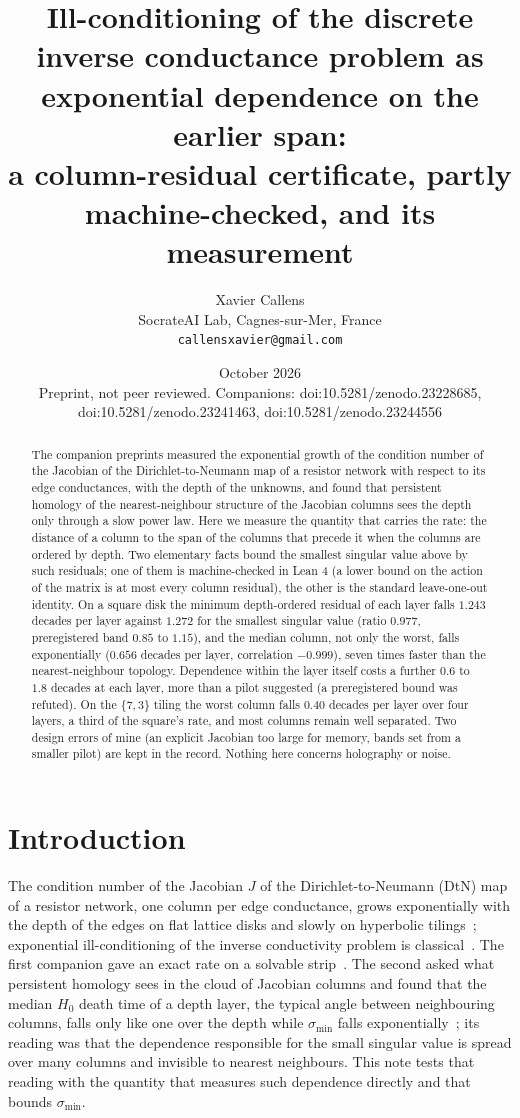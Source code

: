\documentclass[11pt,a4paper]{article}
\title{Ill-conditioning of the discrete inverse conductance problem as exponential dependence on the earlier span:\\ a column-residual certificate, partly machine-checked, and its measurement}
\author{Xavier Callens\\[2pt]
\small SocrateAI Lab, Cagnes-sur-Mer, France\\
\small \texttt{callensxavier@gmail.com}}
\date{October 2026 \\ \small Preprint, not peer reviewed. Companions: doi:10.5281/zenodo.23228685, doi:10.5281/zenodo.23241463, doi:10.5281/zenodo.23244556}
\begin{document}
\maketitle

\begin{abstract}
The companion preprints measured the exponential growth of the condition number of the Jacobian of the Dirichlet-to-Neumann map of a resistor network with respect to its edge conductances, with the depth of the unknowns, and found
that persistent homology of the nearest-neighbour structure of the Jacobian columns sees the depth only through a slow power law. Here we measure the quantity that carries the rate: the distance of a column to the span of the columns that precede it when
the columns are ordered by depth. Two elementary facts bound the smallest singular value above by such residuals; one of them is machine-checked in Lean 4 (a lower bound on the action of the matrix is at most every column residual), the other is the standard leave-one-out identity.
On a square disk the minimum depth-ordered residual of each layer falls $1.243$ decades per layer against $1.272$ for the smallest singular value (ratio $0.977$, preregistered band $0.85$ to $1.15$), and the median column, not only the worst, falls exponentially ($0.656$ decades per layer, correlation $-0.999$),
seven times faster than the nearest-neighbour topology. Dependence within the layer itself costs a further $0.6$ to $1.8$ decades at each layer, more than a pilot suggested (a preregistered bound was refuted). On the $\{7,3\}$ tiling the worst column falls $0.40$ decades per layer over four layers, a third of the square's rate, and most columns remain well separated.
Two design errors of mine (an explicit Jacobian too large for memory, bands set from a smaller pilot) are kept in the record. Nothing here concerns holography or noise.
\end{abstract}

\section{Introduction}
The condition number of the Jacobian $J$ of the Dirichlet-to-Neumann (DtN) map of a resistor network, one column per edge conductance, grows exponentially with the depth of the edges on flat lattice disks and slowly on hyperbolic tilings~\cite{Preprint};
exponential ill-conditioning of the inverse conductivity problem is classical~\cite{DiCristoRondi,BorceaReview}. The first companion gave an exact rate on a solvable strip~\cite{StripPaper}. The second asked what persistent homology sees in the cloud of Jacobian columns and found that the median $H_0$ death time of a depth layer, the typical angle between
neighbouring columns, falls only like one over the depth while $\sigma_{\min}$ falls exponentially~\cite{Paper2}; its reading was that the dependence responsible for the small singular value is spread over many columns and invisible to nearest neighbours. This note tests that reading with the quantity that measures such dependence directly and that bounds $\sigma_{\min}$.
\end{document}
